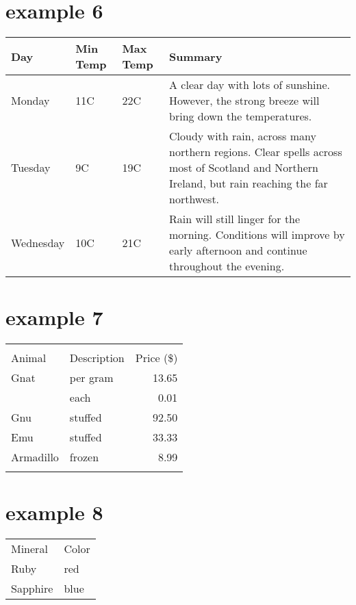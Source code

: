 \documentclass{article}
\begin{document}
\section{example 6}
\begin{center}
    \begin{tabular}{ | l | l | l | p{5cm} |}
    \hline
    Day & Min Temp & Max Temp & Summary \\ \hline
    Monday & 11C & 22C & A clear day with lots of sunshine.  
    However, the strong breeze will bring down the temperatures. \\ \hline
    Tuesday & 9C & 19C & Cloudy with rain, across many northern regions. Clear spells 
    across most of Scotland and Northern Ireland, 
    but rain reaching the far northwest. \\ \hline
    Wednesday & 10C & 21C & Rain will still linger for the morning. 
    Conditions will improve by early afternoon and continue 
    throughout the evening. \\
    \hline
    \end{tabular}
\end{center}

\section{example 7}
\begin{tabular}{ | l | l | r | }
  \hline\noalign{\smallskip}
  \multicolumn{2}{c}{Item} \\
  \cline{1-2}\noalign{\smallskip}
  Animal & Description & Price (\$) \\
  \noalign{\smallskip}\hline\noalign{\smallskip}
  Gnat  & per gram & 13.65 \\
        & each     &  0.01 \\
  Gnu   & stuffed  & 92.50 \\
  Emu   & stuffed  & 33.33 \\
  Armadillo & frozen & 8.99 \\
  \noalign{\smallskip}\hline
\end{tabular}

\section{example 8}
\begin{tabular}{ll}
\hline
Mineral & Color \\[1cm]
Ruby & red \\
Sapphire & blue \\
\hline
\end{tabular}
\end{document}

